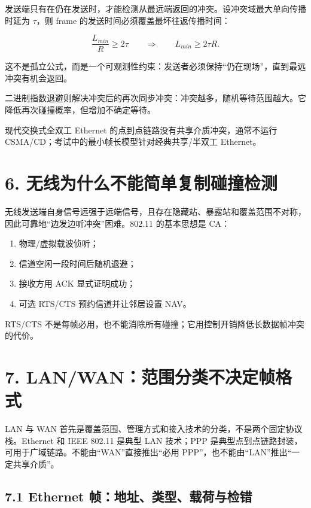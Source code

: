 \documentclass[UTF8,fontset=none,11pt,a4paper]{ctexart}
\providecommand{\tightlist}{\setlength{\itemsep}{0pt}\setlength{\parskip}{0pt}}
\begin{document}
发送端只有在仍在发送时，才能检测从最远端返回的冲突。设冲突域最大单向传播时延为
\(\tau\)，则 frame 的发送时间必须覆盖最坏往返传播时间：

\[
\frac{L_{min}}{R}\ge 2\tau
\qquad\Longrightarrow\qquad
L_{min}\ge 2\tau R.
\]

这不是孤立公式，而是一个可观测性约束：发送者必须保持``仍在现场''，直到最远冲突有机会返回。

二进制指数退避则解决冲突后的再次同步冲突：冲突越多，随机等待范围越大。它降低再次碰撞概率，但增加不确定等待。

现代交换式全双工 Ethernet 的点到点链路没有共享介质冲突，通常不运行
CSMA/CD；考试中的最小帧长模型针对经典共享/半双工 Ethernet。

\section{6.
无线为什么不能简单复制碰撞检测}\label{6-ux65e0ux7ebfux4e3aux4ec0ux4e48ux4e0dux80fdux7b80ux5355ux590dux5236ux78b0ux649eux68c0ux6d4b}

无线发送端自身信号远强于远端信号，且存在隐藏站、暴露站和覆盖范围不对称，因此可靠地``边发边听冲突''困难。802.11
的基本思想是 CA：

\begin{enumerate}
\def\labelenumi{\arabic{enumi}.}
\tightlist
\item
  物理/虚拟载波侦听；
\item
  信道空闲一段时间后随机退避；
\item
  接收方用 ACK 显式证明成功；
\item
  可选 RTS/CTS 预约信道并让邻居设置 NAV。
\end{enumerate}

RTS/CTS
不是每帧必用，也不能消除所有碰撞；它用控制开销降低长数据帧冲突的代价。

\section{7. LAN/WAN：范围分类不决定帧格式}

LAN 与 WAN 首先是覆盖范围、管理方式和接入技术的分类，不是两个固定协议栈。Ethernet 和 IEEE 802.11 是典型 LAN 技术；PPP 是典型点到点链路封装，可用于广域链路。不能由“WAN”直接推出“必用 PPP”，也不能由“LAN”推出“一定共享介质”。

\subsection{7.1 Ethernet 帧：地址、类型、载荷与检错}
\end{document}
